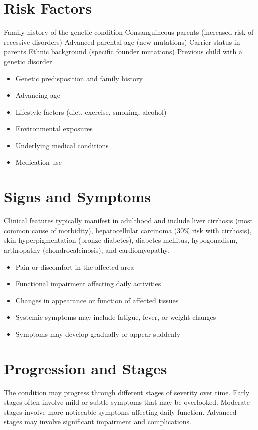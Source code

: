 \section{Risk Factors}
Family history of the genetic condition Consanguineous parents (increased risk of recessive disorders) Advanced parental age (new mutations) Carrier status in parents Ethnic background (specific founder mutations) Previous child with a genetic disorder

\begin{itemize}[noitemsep]
  \item Genetic predisposition and family history
  \item Advancing age
  \item Lifestyle factors (diet, exercise, smoking, alcohol)
  \item Environmental exposures
  \item Underlying medical conditions
  \item Medication use
\end{itemize}
\section{Signs and Symptoms}
Clinical features typically manifest in adulthood and include liver cirrhosis (most common cause of morbidity), hepatocellular carcinoma (30\% risk with cirrhosis), skin hyperpigmentation (bronze diabetes), diabetes mellitus, hypogonadism, arthropathy (chondrocalcinosis), and cardiomyopathy.

\begin{itemize}[noitemsep]
  \item Pain or discomfort in the affected area
  \item Functional impairment affecting daily activities
  \item Changes in appearance or function of affected tissues
  \item Systemic symptoms may include fatigue, fever, or weight changes
  \item Symptoms may develop gradually or appear suddenly
\end{itemize}
\section{Progression and Stages}
The condition may progress through different stages of severity over time. Early stages often involve mild or subtle symptoms that may be overlooked. Moderate stages involve more noticeable symptoms affecting daily function. Advanced stages may involve significant impairment and complications.
